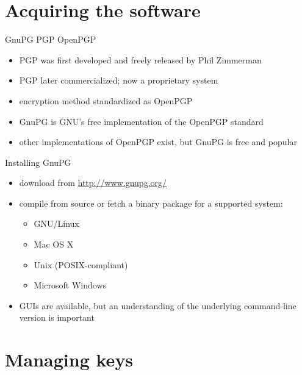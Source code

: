 \documentclass[%
mode=present,%
paper=screen%
]{powerdot}
\begin{document}

\section{Acquiring the software}

\begin{slide}{GnuPG \vs PGP \vs OpenPGP}
  \begin{itemize}
  \item PGP was first developed and freely released by Phil Zimmerman
  \item PGP later commercialized; now a proprietary system
  \item encryption method standardized as OpenPGP
  \item GnuPG is GNU's free implementation of the OpenPGP standard
  \item other implementations of OpenPGP exist, but GnuPG is free and
    popular
  \end{itemize}
\end{slide}

\begin{slide}{Installing GnuPG}
  \begin{itemize}
  \item download from \url{http://www.gnupg.org/}
  \item compile from source or fetch a binary package for a supported
    system:
    \begin{itemize}
    \item GNU/Linux
    \item Mac OS X
    \item Unix (POSIX-compliant)
    \item Microsoft Windows
    \end{itemize}
  \item GUIs are available, but an understanding of the underlying
    command-line version is important
  \end{itemize}
\end{slide}

\section{Managing keys}
\end{document}
